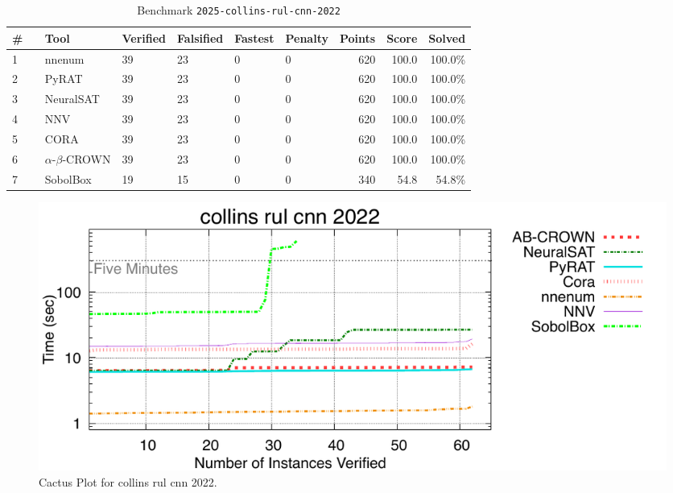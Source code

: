 \begin{table}[h]
\begin{center}
\caption{Benchmark \texttt{2025-collins-rul-cnn-2022}} \label{tab:cat_2025_collins_rul_cnn_2022}
{\setlength{\tabcolsep}{2pt}
\begin{tabular}[h]{@{}llllllrrr@{}}
\toprule
\textbf{\# ~} & \textbf{Tool} & \textbf{Verified} & \textbf{Falsified} & \textbf{Fastest} & \textbf{Penalty} & \textbf{Points} & \textbf{Score} & \textbf{Solved}\\
\midrule
1 & nnenum & 39 & 23 & 0 & 0 & 620 & 100.0 & 100.0\% \\
2 & PyRAT & 39 & 23 & 0 & 0 & 620 & 100.0 & 100.0\% \\
3 & NeuralSAT & 39 & 23 & 0 & 0 & 620 & 100.0 & 100.0\% \\
4 & NNV & 39 & 23 & 0 & 0 & 620 & 100.0 & 100.0\% \\
5 & CORA & 39 & 23 & 0 & 0 & 620 & 100.0 & 100.0\% \\
6 & $\alpha$-$\beta$-CROWN & 39 & 23 & 0 & 0 & 620 & 100.0 & 100.0\% \\
7 & SobolBox & 19 & 15 & 0 & 0 & 340 & 54.8 & 54.8\% \\
\bottomrule
\end{tabular}
}
\end{center}
\end{table}



\begin{figure}[h]
\centerline{\includegraphics[width=\textwidth]{cactus/2025_collins_rul_cnn_2022.pdf}}
\caption{Cactus Plot for collins rul cnn 2022.}
\label{fig:quantPic}
\end{figure}


\clearpage

